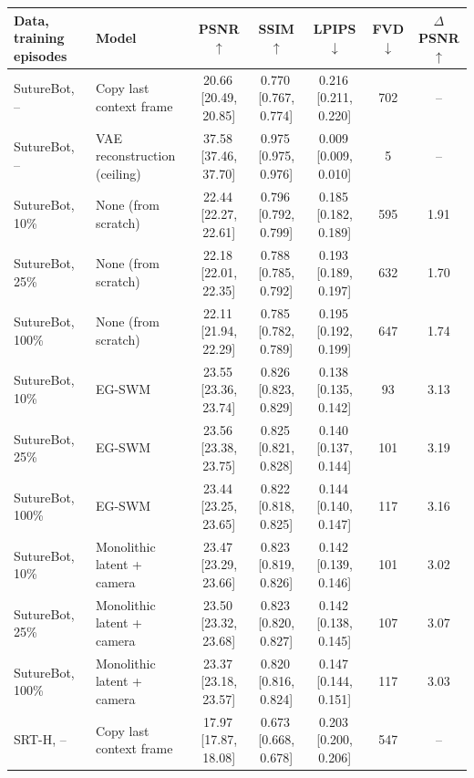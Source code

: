 \begin{tabular}{llccccc}
\toprule
Data, training episodes & Model & PSNR$\uparrow$ & SSIM$\uparrow$ & LPIPS$\downarrow$ & FVD$\downarrow$ & $\Delta$PSNR$\uparrow$ \\
\midrule
SutureBot, -- & Copy last context frame & 20.66\,{\scriptsize[20.49, 20.85]} & 0.770\,{\scriptsize[0.767, 0.774]} & 0.216\,{\scriptsize[0.211, 0.220]} & 702 & -- \\
SutureBot, -- & VAE reconstruction (ceiling) & 37.58\,{\scriptsize[37.46, 37.70]} & 0.975\,{\scriptsize[0.975, 0.976]} & 0.009\,{\scriptsize[0.009, 0.010]} & 5 & -- \\
SutureBot, 10\% & None (from scratch) & 22.44\,{\scriptsize[22.27, 22.61]} & 0.796\,{\scriptsize[0.792, 0.799]} & 0.185\,{\scriptsize[0.182, 0.189]} & 595 & 1.91 \\
SutureBot, 25\% & None (from scratch) & 22.18\,{\scriptsize[22.01, 22.35]} & 0.788\,{\scriptsize[0.785, 0.792]} & 0.193\,{\scriptsize[0.189, 0.197]} & 632 & 1.70 \\
SutureBot, 100\% & None (from scratch) & 22.11\,{\scriptsize[21.94, 22.29]} & 0.785\,{\scriptsize[0.782, 0.789]} & 0.195\,{\scriptsize[0.192, 0.199]} & 647 & 1.74 \\
SutureBot, 10\% & EG-SWM & 23.55\,{\scriptsize[23.36, 23.74]} & 0.826\,{\scriptsize[0.823, 0.829]} & 0.138\,{\scriptsize[0.135, 0.142]} & 93 & 3.13 \\
SutureBot, 25\% & EG-SWM & 23.56\,{\scriptsize[23.38, 23.75]} & 0.825\,{\scriptsize[0.821, 0.828]} & 0.140\,{\scriptsize[0.137, 0.144]} & 101 & 3.19 \\
SutureBot, 100\% & EG-SWM & 23.44\,{\scriptsize[23.25, 23.65]} & 0.822\,{\scriptsize[0.818, 0.825]} & 0.144\,{\scriptsize[0.140, 0.147]} & 117 & 3.16 \\
SutureBot, 10\% & Monolithic latent + camera & 23.47\,{\scriptsize[23.29, 23.66]} & 0.823\,{\scriptsize[0.819, 0.826]} & 0.142\,{\scriptsize[0.139, 0.146]} & 101 & 3.02 \\
SutureBot, 25\% & Monolithic latent + camera & 23.50\,{\scriptsize[23.32, 23.68]} & 0.823\,{\scriptsize[0.820, 0.827]} & 0.142\,{\scriptsize[0.138, 0.145]} & 107 & 3.07 \\
SutureBot, 100\% & Monolithic latent + camera & 23.37\,{\scriptsize[23.18, 23.57]} & 0.820\,{\scriptsize[0.816, 0.824]} & 0.147\,{\scriptsize[0.144, 0.151]} & 117 & 3.03 \\
\midrule
SRT-H, -- & Copy last context frame & 17.97\,{\scriptsize[17.87, 18.08]} & 0.673\,{\scriptsize[0.668, 0.678]} & 0.203\,{\scriptsize[0.200, 0.206]} & 547 & -- \\

\end{tabular}
